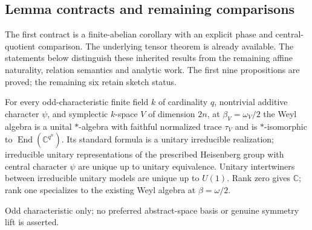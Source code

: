\subsection{Lemma contracts and remaining comparisons}

The first contract is a finite-abelian corollary with an explicit phase and
central-quotient comparison. The underlying tensor theorem is already
available. The statements below distinguish these inherited results from
the remaining affine naturality, relation semantics and analytic work.
The first nine propositions are proved; the remaining six retain sketch status.

\begin{proposition}
\statusProved{}
For every odd-characteristic finite field $k$ of cardinality $q$, nontrivial additive
character $\psi$, and symplectic $k$-space $V$ of dimension $2n$, at
$\beta_V=\omega_V/2$ the Weyl algebra is a unital $*$-algebra with faithful
normalized trace $\tau_V$ and is $*$-isomorphic to $\operatorname{End}(\mathbb
C^{q^n})$. Its standard formula is a unitary irreducible realization;
irreducible unitary representations of the prescribed Heisenberg group with central character $\psi$ are unique up to unitary equivalence. Unitary
intertwiners between irreducible unitary models are unique up to $U(1)$. Rank zero
gives $\mathbb C$; rank one specializes to the existing Weyl algebra at
$\beta=\omega/2$.
\end{proposition}
\begin{scope}
Odd characteristic only; no preferred abstract-space basis or genuine symmetry lift is asserted.
\end{scope}


